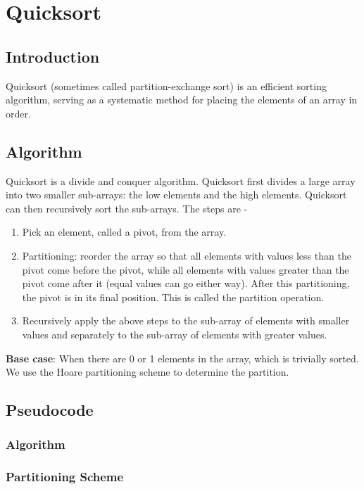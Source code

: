 \section{Quicksort}
\subsection{Introduction}
Quicksort (sometimes called partition-exchange sort) is an efficient sorting algorithm, serving as a systematic method for placing the elements of an array in order.\cite{quicksort}
\subsection{Algorithm}
Quicksort is a divide and conquer algorithm. Quicksort first divides a large array into two smaller sub-arrays: the low elements and the high elements. Quicksort can then recursively sort the sub-arrays. The steps are -
\begin{enumerate}
	\item{Pick an element, called a pivot, from the array.}
	\item{Partitioning: reorder the array so that all elements with values less than the pivot come before the pivot, while all elements with values greater than the pivot come after it (equal values can go either way). After this partitioning, the pivot is in its final position. This is called the partition operation.}
	\item{Recursively apply the above steps to the sub-array of elements with smaller values and separately to the sub-array of elements with greater values.}
\end{enumerate}
\textbf{Base case}: When there are 0 or 1 elements in the array, which is trivially sorted.
We use the Hoare partitioning scheme to determine the partition.
\subsection{Pseudocode}
	\subsubsection{Algorithm}
	
	\begin{algorithmic}[1]
    			\EndIf 
		\EndFunction 
	\end{algorithmic}
	
	\subsubsection{Partitioning Scheme}

	\begin{algorithmic}[1]
				\EndIf
			\EndFor
		\EndFunction	
	\end{algorithmic}
	